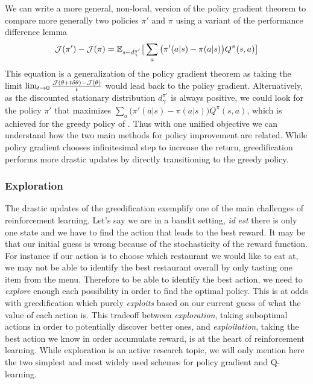 We can write a more general, non-local, version of the policy gradient theorem to compare more generally two policies $\pi'$ and $\pi$ using a variant of the performance difference lemma~\citep{kakade2002approximately}
\begin{equation}
    {\mathcal{J}}(\pi') - {\mathcal{J}}(\pi) = \mathbb{E}_{s \sim d^{\pi'}_\gamma} \big[ \sum_a \big(\pi'(a|s)-\pi(a|s)\big) Q^\pi(s,a)\big]
\end{equation}
This equation is a generalization of the policy gradient theorem as taking the
limit $\lim_{t\to 0} \frac{{\mathcal{J}}(\theta+t \delta \theta)-{\mathcal{J}}(\theta)}{t}$ would
lead back to the policy gradient. Alternatively, as the discounted stationary
distribution $d^{\pi'}_\gamma$ is always positive, we could look for the policy $\pi'$ that maximizes $ \sum_a \big(\pi'(a|s)-\pi(a|s)\big) Q^\pi(s,a)$, which is achieved for the greedy policy of . Thus with one unified objective we can understand how the two main methods for policy improvement are related. While policy gradient chooses infinitesimal step to increase the return, greedification performs more drastic updates by directly transitioning to the greedy policy.

\subsubsection{Exploration}
\label{subsubsec:exploration}
The drastic updates of the greedification exemplify one of the main challenges of reinforcement learning. Let's say we are in a bandit setting, \emph{id est} there is only one state and we have to find the action that leads to the best reward. It may be that our initial guess is wrong because of the stochasticity of the reward function. For instance if our action is to choose which restaurant we would like to eat at, we may not be able to identify the best restaurant overall by only tasting one item from the menu. Therefore to be able to identify the best action, we need to \emph{explore} enough each possibility in order to find the optimal policy. This is at odds with greedification which purely \emph{exploits} based on our current guess of what the value of each action is. This tradeoff between \emph{exploration}, taking suboptimal actions in order to potentially discover better ones, and \emph{exploitation}, taking the best action we know in order accumulate reward, is at the heart of reinforcement learning. While exploration is an active research topic, we will only mention here the two simplest and most widely used schemes for policy gradient and Q-learning.

